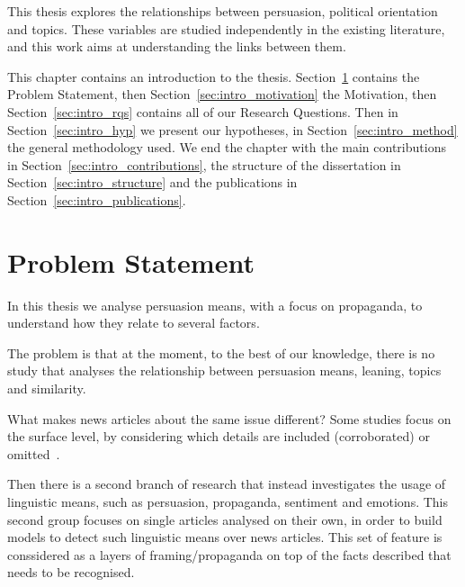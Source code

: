 This thesis explores the relationships between persuasion, political orientation and topics.
These variables are studied independently in the existing literature, and this work aims at understanding the links between them.









This chapter contains an introduction to the thesis.
Section~\ref{sec:intro_problem} contains the Problem Statement, then Section~\ref{sec:intro_motivation} the Motivation, then Section~\ref{sec:intro_rqs} contains all of our Research Questions. Then in Section~\ref{sec:intro_hyp} we present our hypotheses, in Section~\ref{sec:intro_method} the general methodology used. We end the chapter with the main contributions in Section~\ref{sec:intro_contributions}, the structure of the dissertation in Section~\ref{sec:intro_structure} and the publications in Section~\ref{sec:intro_publications}.


\section{Problem Statement}
\label{sec:intro_problem}



In this thesis we analyse persuasion means, with a focus on propaganda, to understand how they relate to several factors.

The problem is that at the moment, to the best of our knowledge, there is no study that analyses the relationship between persuasion means, leaning, topics and similarity.

What makes news articles about the same issue different? 
Some studies focus on the surface level, by considering which details are included (corroborated) or omitted~\citep{bountouridis2018explaining}.

Then there is a second branch of research that instead investigates the usage of linguistic means, such as persuasion, propaganda, sentiment and emotions. This second group focuses on single articles analysed on their own, in order to build models to detect such linguistic means over news articles. This set of feature is conssidered as a layers of framing/propaganda on top of the facts described that needs to be recognised.

